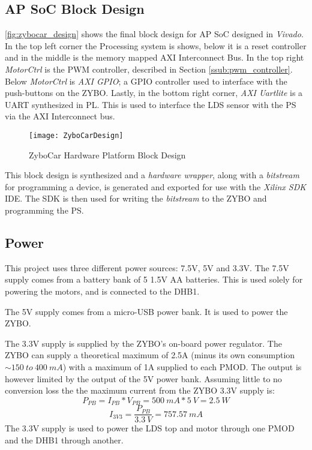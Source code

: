 \documentclass[Main]{subfiles}
\begin{document}
		

	\subsection{AP SoC Block Design} %
	\label{sub:ap_soc_block_design}

		\autoref{fig:zybocar_design} shows the final block design for AP SoC designed in \emph{Vivado}.
		In the top left corner the Processing system is shows, below it is a reset controller and in the middle is the memory mapped AXI Interconnect Bus.
		In the top right \emph{MotorCtrl} is the PWM controller, described in Section \ref{ssub:pwm_controller}.
		Below \emph{MotorCtrl} is \emph{AXI GPIO}; a GPIO controller used to interface with the push-buttons on the ZYBO.
		Lastly, in the bottom right corner, \emph{AXI Uartlite} is a UART synthesized in PL.
		This is used to interface the LDS sensor with the PS via the AXI Interconnect bus.

		\begin{figure}[H]
			\centering
			\texttt{[image: ZyboCarDesign]}
			\caption{ZyboCar Hardware Platform Block Design}
			\label{fig:zybocar_design}
		\end{figure}

		This block design is synthesized and a \emph{hardware wrapper}, along with a \emph{bitstream} for programming a device, is generated and exported for use with the \emph{Xilinx SDK} IDE.
		The SDK is then used for writing the \emph{bitstream} to the ZYBO and programming the PS. 


	\subsection{Power} %
	\label{sub:power}

		This project uses three different power sources: 7.5V, 5V and 3.3V.
		The 7.5V supply comes from a battery bank of 5 1.5V AA batteries.
		This is used solely for powering the motors, and is connected to the DHB1.

		The 5V supply comes from a micro-USB power bank. 
		It is used to power the ZYBO.

		The 3.3V supply is supplied by the ZYBO's on-board power regulator.
		The ZYBO can supply a theoretical maximum of 2.5A (minus its own consumption $\sim150\ to\ 400\ mA$) with a maximum of 1A supplied to each PMOD.
		The output is however limited by the output of the 5V power bank.
		Assuming little to no conversion loss the the maximum current from the ZYBO 3.3V supply is:
		\begin{equation}
			P_{PB} = I_{PB} * V_{PB} = 
			500\ mA * 5\ V =
			2.5\ W
		\end{equation}
		\begin{equation}
			I_{3V3} = 
			\frac{P_{PB}}{3.3\ V} =
			757.57\ mA
		\end{equation}
		The 3.3V supply is used to power the LDS top and motor through one PMOD and the DHB1 through another.


\end{document}
